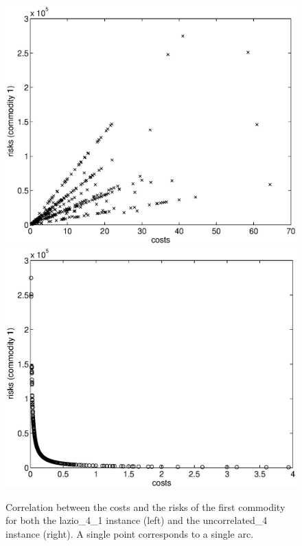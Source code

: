 \documentclass[preprint,12pt]{elsarticle}
\begin{document}
\begin{figure}
	\centering
	\includegraphics[width=0.48\columnwidth]{figs/correlationLazio41.eps}
	\hfill
	\includegraphics[width=0.48\columnwidth]{figs/correlationUncorrelated4.eps}
	\caption{\label{fig:correlation} Correlation between the costs and the risks of the first commodity for both the lazio\_4\_1 instance (left) and the uncorrelated\_4 instance (right). A single point corresponds to a single arc.}
\end{figure}

\end{document}
